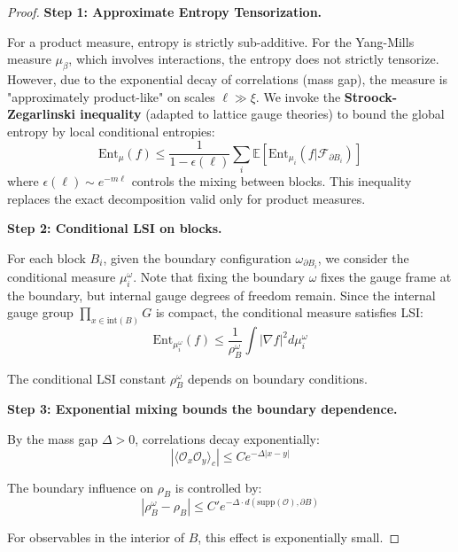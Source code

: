 \begin{proof}
\textbf{Step 1: Approximate Entropy Tensorization.}

For a product measure, entropy is strictly sub-additive. For the Yang-Mills measure $\mu_\beta$, which involves interactions, the entropy does not strictly tensorize. However, due to the exponential decay of correlations (mass gap), the measure is "approximately product-like" on scales $\ell \gg \xi$. We invoke the \textbf{Stroock-Zegarlinski inequality} (adapted to lattice gauge theories) to bound the global entropy by local conditional entropies:
\begin{equation}
\mathrm{Ent}_{\mu}(f) \leq \frac{1}{1 - \epsilon(\ell)} \sum_i \mathbb{E}[\mathrm{Ent}_{\mu_i}(f | \mathcal{F}_{\partial B_i})]
\end{equation}
where $\epsilon(\ell) \sim e^{-m\ell}$ controls the mixing between blocks. This inequality replaces the exact decomposition valid only for product measures.

\textbf{Step 2: Conditional LSI on blocks.}

For each block $B_i$, given the boundary configuration $\omega_{\partial B_i}$, we consider the conditional measure $\mu_i^{\omega}$. Note that fixing the boundary $\omega$ fixes the gauge frame at the boundary, but internal gauge degrees of freedom remain. Since the internal gauge group $\prod_{x \in \text{int}(B)} G$ is compact, the conditional measure satisfies LSI:
\begin{equation}
\mathrm{Ent}_{\mu_i^{\omega}}(f) \leq \frac{1}{\rho_B^{\omega}} 
\int |\nabla f|^2 d\mu_i^{\omega}
\end{equation}

The conditional LSI constant $\rho_B^{\omega}$ depends on boundary conditions.

\textbf{Step 3: Exponential mixing bounds the boundary dependence.}

By the mass gap $\Delta > 0$, correlations decay exponentially:
\begin{equation}
|\langle \mathcal{O}_x \mathcal{O}_y \rangle_c| \leq C e^{-\Delta |x-y|}
\end{equation}

The boundary influence on $\rho_B$ is controlled by:
\begin{equation}
|\rho_B^{\omega} - \rho_B| \leq C' e^{-\Delta \cdot d(\mathrm{supp}(\mathcal{O}), \partial B)}
\end{equation}

For observables in the interior of $B$, this effect is exponentially small.


\end{proof}
